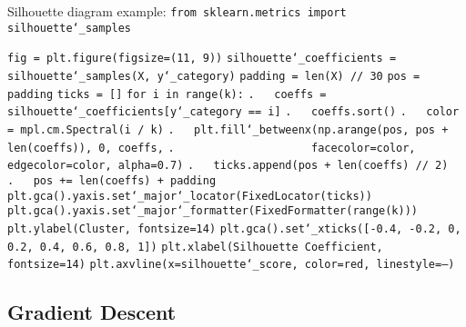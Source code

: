 \newpage
Silhouette diagram example:\newline
\texttt{from sklearn.metrics import silhouette\char`_samples}

\texttt{fig = plt.figure(figsize=(11, 9))}\newline
\texttt{silhouette\char`_coefficients = silhouette\char`_samples(X, y\char`_category)}\newline
\texttt{padding = len(X) // 30}\newline
\texttt{pos = padding}\newline
\texttt{ticks = []}\newline
\texttt{for i in range(k):}\newline
\texttt{.~~~coeffs = silhouette\char`_coefficients[y\char`_category == i]}\newline
\texttt{.~~~coeffs.sort()}\newline
\texttt{.~~~color = mpl.cm.Spectral(i / k)}\newline
\texttt{.~~~plt.fill\char`_betweenx(np.arange(pos, pos + len(coeffs)), 0, coeffs,}\newline
\texttt{.~~~~~~~~~~~~~~~~~~~~~facecolor=color, edgecolor=color, alpha=0.7)}\newline
\texttt{.~~~ticks.append(pos + len(coeffs) // 2)}\newline
\texttt{.~~~pos += len(coeffs) + padding}\newline
\texttt{plt.gca().yaxis.set\char`_major\char`_locator(FixedLocator(ticks))}\newline
\texttt{plt.gca().yaxis.set\char`_major\char`_formatter(FixedFormatter(range(k)))}\newline
\texttt{plt.ylabel(\textquotesingle Cluster\textquotesingle , fontsize=14)}\newline
\texttt{plt.gca().set\char`_xticks([-0.4, -0.2, 0, 0.2, 0.4, 0.6, 0.8, 1])}\newline
\texttt{plt.xlabel(\textquotesingle Silhouette Coefficient\textquotesingle , fontsize=14)}\newline
\texttt{plt.axvline(x=silhouette\char`_score, color=\textquotesingle red\textquotesingle , linestyle=\textquotesingle --\textquotesingle )}\newline

\subsection{Gradient Descent}

